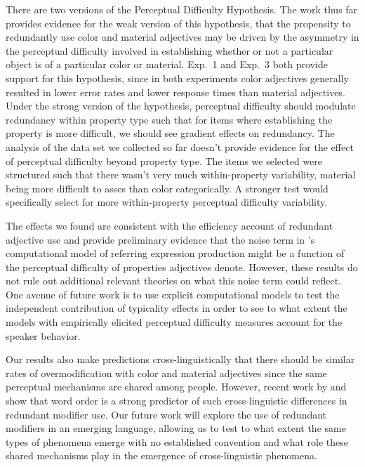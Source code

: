 \documentclass[12pt,letterpaper]{article}
\begin{document}
There are two versions of the Perceptual Difficulty Hypothesis. The work thus far provides evidence for the weak version of this hypothesis, that the propensity to redundantly use color and material adjectives may be driven by the asymmetry in the perceptual difficulty involved in establishing whether or not a particular object is of a particular color or material. Exp.~1 and Exp.~3 both provide support for this hypothesis, since in both experiments color adjectives generally resulted in lower error rates and lower response times than material adjectives. Under the strong version of the hypothesis, perceptual difficulty should modulate redundancy within property type such that for items where establishing the property is more difficult, we should see gradient effects on redundancy. The analysis of the data set we collected so far doesn't provide evidence for the effect of perceptual difficulty beyond property type. The items we selected were structured such that there wasn't very much within-property variability, material being more difficult to asses than color categorically. A stronger test would specifically select for more within-property perceptual difficulty variability.

The effects we found are consistent with the efficiency account of redundant adjective use and provide preliminary evidence that the noise term in \citet{DegenEtAl2020}'s computational model of referring expression production might be a function of the perceptual difficulty of properties adjectives denote. However, these results do not rule out additional relevant theories on what this noise term could reflect. One avenue of future work is to use explicit computational models to test the independent contribution of typicality effects in order to see to what extent the models with empirically elicited perceptual difficulty measures account for the speaker behavior. 

Our results also make predictions cross-linguistically that there should be similar rates of overmodification with color and material adjectives since the same perceptual mechanisms are shared among people. However, recent work by \citet{Rubio2020} and \citet{WuGibson2021} show that word order is a strong predictor of such cross-linguistic differences in redundant modifier use. Our future work will explore the use of redundant modifiers in an emerging language, allowing us to test to what extent the same types of phenomena emerge with no established convention and what role these shared mechanisms play in the emergence of cross-linguistic phenomena.
\end{document}
